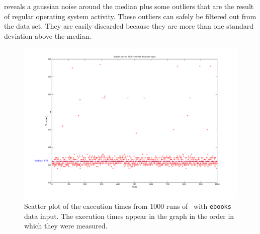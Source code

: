  reveals a gaussian noise around the median plus some outliers that are the result of regular operating system activity. These outliers can safely be filtered out from the data set. They are easily discarded because they are more than one standard deviation above the median.

\begin{figure}
  \centering
  \includegraphics[width=1.00\linewidth]{Figures/nt1000}
  \caption{Scatter plot of the execution times from $1000$ runs of \bzip\ with {\tt ebooks} data input. The execution times appear in the graph in the order in which they were measured.}
  \label{fig:gauss}
\end{figure}

